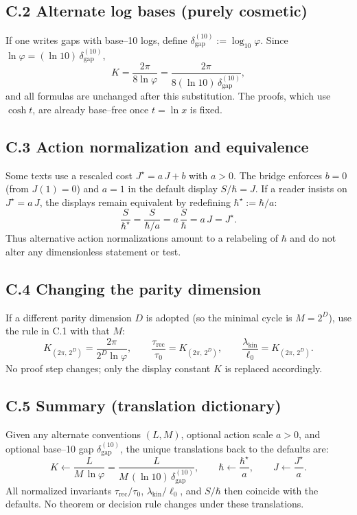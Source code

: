\documentclass[11pt]{article}
\theoremstyle{plain}
\theoremstyle{definition}
\theoremstyle{remark}
\begin{document}
\subsection*{C.2 Alternate log bases (purely cosmetic)}
If one writes gaps with base–10 logs, define \(\delta_{\mathrm{gap}}^{(10)}:=\log_{10}\varphi\). Since \(\ln\varphi=(\ln 10)\,\delta_{\mathrm{gap}}^{(10)}\),
\[
K=\frac{2\pi}{8\ln\varphi}
=\frac{2\pi}{8(\ln 10)\,\delta_{\mathrm{gap}}^{(10)}},
\]
and all formulas are unchanged after this substitution. The proofs, which use \(\cosh t\), are already base–free once \(t=\ln x\) is fixed.

\subsection*{C.3 Action normalization and equivalence}
Some texts use a rescaled cost \(J^{\star}=a\,J+b\) with \(a>0\). The bridge enforces \(b=0\) (from \(J(1)=0\)) and \(a=1\) in the default display \(S/\hbar=J\). If a reader insists on \(J^{\star}=a\,J\), the displays remain equivalent by redefining \(\hbar^{\star}:=\hbar/a\):
\[
\frac{S}{\hbar^{\star}}=\frac{S}{\hbar/a}=a\,\frac{S}{\hbar}=a\,J=J^{\star}.
\]
Thus alternative action normalizations amount to a relabeling of \(\hbar\) and do not alter any dimensionless statement or test.

\subsection*{C.4 Changing the parity dimension}
If a different parity dimension \(D\) is adopted (so the minimal cycle is \(M=2^{D}\)), use the rule in C.1 with that \(M\):
\[
K_{(2\pi,\,2^{D})}=\frac{2\pi}{2^{D}\ln\varphi},\qquad
\frac{\tau_{\mathrm{rec}}}{\tau_{0}}=K_{(2\pi,\,2^{D})},\qquad
\frac{\lambda_{\mathrm{kin}}}{\ell_{0}}=K_{(2\pi,\,2^{D})}.
\]
No proof step changes; only the display constant \(K\) is replaced accordingly.

\subsection*{C.5 Summary (translation dictionary)}
Given any alternate conventions \((L,M)\), optional action scale \(a>0\), and optional base–10 gap \(\delta_{\mathrm{gap}}^{(10)}\), the unique translations back to the defaults are:
\[
K\leftarrow \frac{L}{M\,\ln\varphi}
=\frac{L}{M\,(\ln 10)\,\delta_{\mathrm{gap}}^{(10)}},\qquad
\hbar\leftarrow \frac{\hbar^{\star}}{a},\qquad
J\leftarrow \frac{J^{\star}}{a}.
\]
All normalized invariants \(\tau_{\mathrm{rec}}/\tau_{0}\), \(\lambda_{\mathrm{kin}}/\ell_{0}\), and \(S/\hbar\) then coincide with the defaults. No theorem or decision rule changes under these translations.
\end{document}
